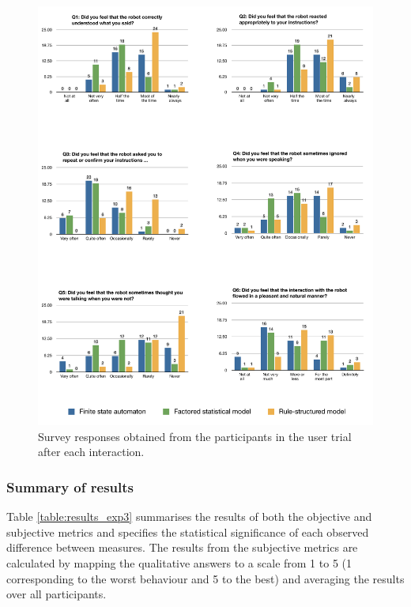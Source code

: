 \begin{figure}[p]
\begin{center}
\includegraphics[scale=0.5]{imgs/subjective.pdf}
\end{center} 
\caption{Survey responses obtained from the participants in the user trial after each interaction. }
\label{fig:subjective}
\end{figure}

\subsubsection*{Summary of results}

Table \ref{table:results_exp3} summarises the results of both the objective and subjective metrics and specifies the statistical significance of each observed difference between measures.  The results from the subjective metrics are calculated by mapping the qualitative answers to a scale from 1 to 5 (1 corresponding to the worst behaviour and 5 to the best) and averaging the results over all participants. 

